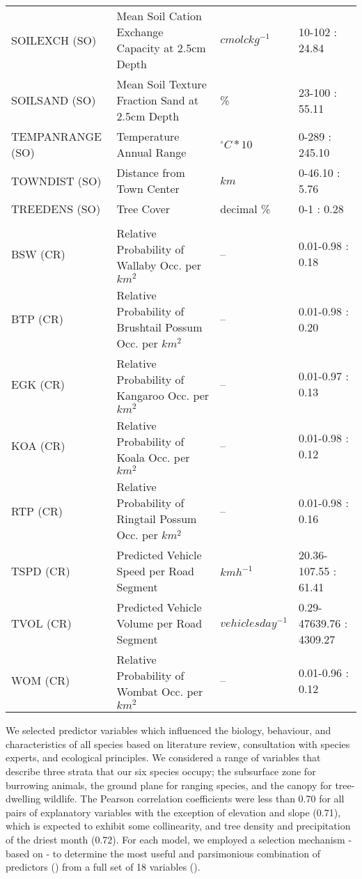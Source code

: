 \begin{table}[htp]
\begin{tabularx}{\textwidth}{lYll}
SOILEXCH (SO)   &Mean Soil Cation Exchange Capacity at 2.5cm Depth        &$cmolc kg^{-1}$     &10-102 : 24.84\\
SOILSAND (SO)   &Mean Soil Texture Fraction Sand at 2.5cm Depth           &\%             &23-100 : 55.11\\
TEMPANRANGE (SO)&Temperature Annual Range                                 &$^{\circ}C*10$ &0-289 : 245.10\\
TOWNDIST (SO)   &Distance from Town Center                                &$km$           &0-46.10 : 5.76\\
TREEDENS (SO)   &Tree Cover                                               &decimal \%     &0-1 : 0.28\\
&&&\\
BSW (CR)        &Relative Probability of Wallaby Occ. per $km^2$          &--             &0.01-0.98 : 0.18\\
BTP (CR)        &Relative Probability of Brushtail Possum Occ. per $km^2$ &--             &0.01-0.98 : 0.20\\
EGK (CR)        &Relative Probability of Kangaroo Occ. per $km^2$         &--             &0.01-0.97 : 0.13\\
KOA (CR)        &Relative Probability of Koala Occ. per $km^2$            &--             &0.01-0.98 : 0.12\\
RTP (CR)        &Relative Probability of Ringtail Possum Occ. per $km^2$  &--             &0.01-0.98 : 0.16\\
TSPD (CR)       &Predicted Vehicle Speed per Road Segment                 &$km h^{-1}$         &20.36-107.55 : 61.41\\
TVOL (CR)       &Predicted Vehicle Volume per Road Segment                &$vehicles day^{-1}$ &0.29-47639.76 : 4309.27\\
WOM (CR)        &Relative Probability of Wombat Occ. per $km^2$           &--             &0.01-0.96 : 0.12\\
\bottomrule
\end{tabularx}
\label{6sp_variables}
\end{table}

We selected predictor variables which influenced the biology, behaviour, and characteristics of all species based on literature review, consultation with species experts, and ecological principles. We considered a range of variables that describe three strata that our six species occupy; the subsurface zone for burrowing animals, the ground plane for ranging species, and the canopy for tree-dwelling wildlife. The Pearson correlation coefficients were less than 0.70 for all pairs of explanatory variables with the exception of elevation and slope (0.71), which is expected to exhibit some collinearity, and tree density and precipitation of the driest month (0.72). For each model, we employed a selection mechanism - based on \cite{elit08} - to determine the most useful and parsimonious combination of predictors () from a full set of 18 variables ().

